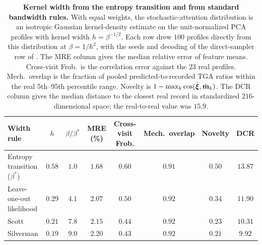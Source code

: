 \begin{table}[ht]
\centering
\caption{\textbf{Kernel width from the entropy transition and from standard bandwidth
rules.} With equal weights, the stochastic-attention distribution is an isotropic Gaussian
kernel-density estimate on the unit-normalized PCA profiles with kernel width
$h=\beta^{-1/2}$. Each row drew $100$ profiles directly from this distribution at
$\beta=1/h^2$, with the seeds and decoding of the direct-sampler row of
. The MRE column gives the median relative error of feature means.
Cross-visit Frob.\ is the correlation error against the $23$ real profiles. Mech.\ overlap is
the fraction of pooled predicted-to-recorded TGA ratios within the real 5th--95th percentile
range. Novelty is $1-\max_k\cos(\hat{\boldsymbol{\xi}},\hat{\mathbf{m}}_k)$. The DCR column gives the median distance
to the closest real record in standardized $216$-dimensional space; the real-to-real value
was $15.9$.}
\label{stab:kde-bandwidth}
{\small
\setlength{\tabcolsep}{4pt}
\begin{tabular}{lccccccc}
\toprule
Width rule & $h$ & $\beta/\beta^*$ & MRE (\%) & Cross-visit Frob. & Mech.\ overlap & Novelty & DCR \\
\midrule
Entropy transition ($\beta^*$) & $0.58$ & $1.0$ & $1.68$ & $0.60$ & $0.91$ & $0.50$ & $13.87$ \\
Leave-one-out likelihood       & $0.29$ & $4.1$ & $2.07$ & $0.50$ & $0.92$ & $0.34$ & $11.90$ \\
Scott                          & $0.21$ & $7.8$ & $2.15$ & $0.44$ & $0.92$ & $0.23$ & $10.31$ \\
Silverman                      & $0.19$ & $9.0$ & $2.20$ & $0.43$ & $0.92$ & $0.21$ & $9.92$ \\
\bottomrule
\end{tabular}
}
\end{table}

